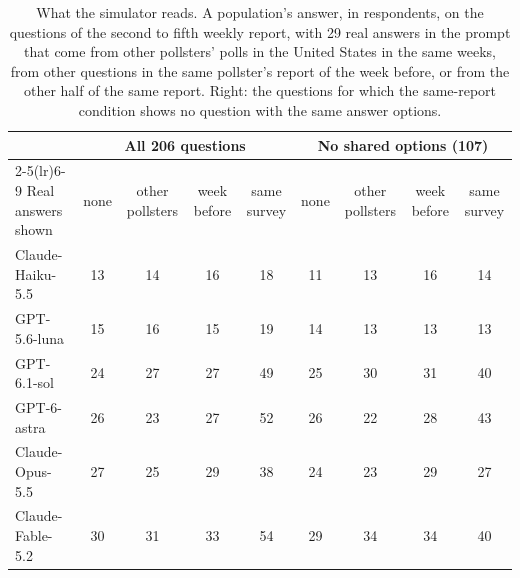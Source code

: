 \begin{table}[h]
\centering\small
\setlength{\tabcolsep}{4.5pt}
\begin{tabular}{lcccccccc}
\toprule
 & \multicolumn{4}{c}{All 206 questions} & \multicolumn{4}{c}{No shared options (107)} \\
\cmidrule(lr){2-5}\cmidrule(lr){6-9}
Real answers shown & none & other pollsters & week before & same survey & none & other pollsters & week before & same survey \\
\midrule
Claude-Haiku-5.5 & 13 & 14 & 16 & 18 & 11 & 13 & 16 & 14 \\
GPT-5.6-luna & 15 & 16 & 15 & 19 & 14 & 13 & 13 & 13 \\
GPT-6.1-sol & 24 & 27 & 27 & 49 & 25 & 30 & 31 & 40 \\
GPT-6-astra & 26 & 23 & 27 & 52 & 26 & 22 & 28 & 43 \\
Claude-Opus-5.5 & 27 & 25 & 29 & 38 & 24 & 23 & 29 & 27 \\
Claude-Fable-5.2 & 30 & 31 & 33 & 54 & 29 & 34 & 34 & 40 \\
\bottomrule
\end{tabular}
\caption{What the simulator reads. A population's answer, in respondents, on the questions of the second to fifth weekly report, with 29 real answers in the prompt that come from other pollsters' polls in the United States in the same weeks, from other questions in the same pollster's report of the week before, or from the other half of the same report. Right: the questions for which the same-report condition shows no question with the same answer options.}
\label{tab:ctl}
\end{table}
